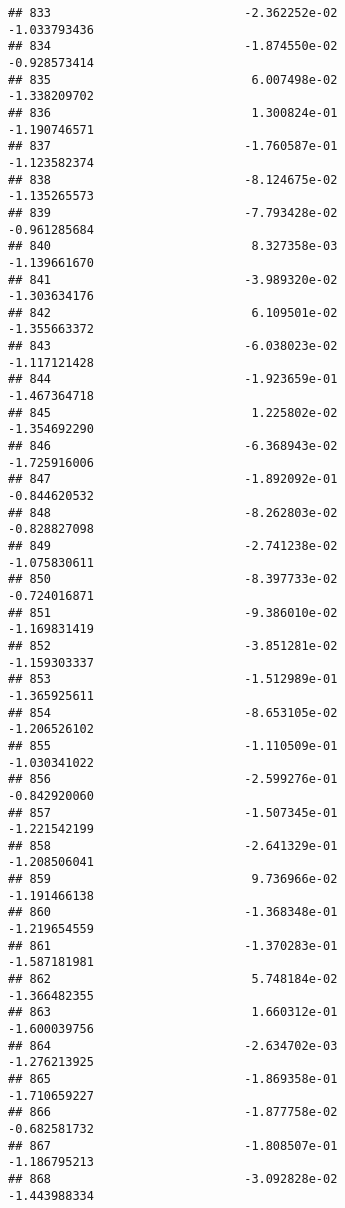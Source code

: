 \documentclass[
]{article}
\begin{document}
\begin{verbatim}
## 833                           -2.362252e-02               -1.033793436
## 834                           -1.874550e-02               -0.928573414
## 835                            6.007498e-02               -1.338209702
## 836                            1.300824e-01               -1.190746571
## 837                           -1.760587e-01               -1.123582374
## 838                           -8.124675e-02               -1.135265573
## 839                           -7.793428e-02               -0.961285684
## 840                            8.327358e-03               -1.139661670
## 841                           -3.989320e-02               -1.303634176
## 842                            6.109501e-02               -1.355663372
## 843                           -6.038023e-02               -1.117121428
## 844                           -1.923659e-01               -1.467364718
## 845                            1.225802e-02               -1.354692290
## 846                           -6.368943e-02               -1.725916006
## 847                           -1.892092e-01               -0.844620532
## 848                           -8.262803e-02               -0.828827098
## 849                           -2.741238e-02               -1.075830611
## 850                           -8.397733e-02               -0.724016871
## 851                           -9.386010e-02               -1.169831419
## 852                           -3.851281e-02               -1.159303337
## 853                           -1.512989e-01               -1.365925611
## 854                           -8.653105e-02               -1.206526102
## 855                           -1.110509e-01               -1.030341022
## 856                           -2.599276e-01               -0.842920060
## 857                           -1.507345e-01               -1.221542199
## 858                           -2.641329e-01               -1.208506041
## 859                            9.736966e-02               -1.191466138
## 860                           -1.368348e-01               -1.219654559
## 861                           -1.370283e-01               -1.587181981
## 862                            5.748184e-02               -1.366482355
## 863                            1.660312e-01               -1.600039756
## 864                           -2.634702e-03               -1.276213925
## 865                           -1.869358e-01               -1.710659227
## 866                           -1.877758e-02               -0.682581732
## 867                           -1.808507e-01               -1.186795213
## 868                           -3.092828e-02               -1.443988334

\end{verbatim}
\end{document}
